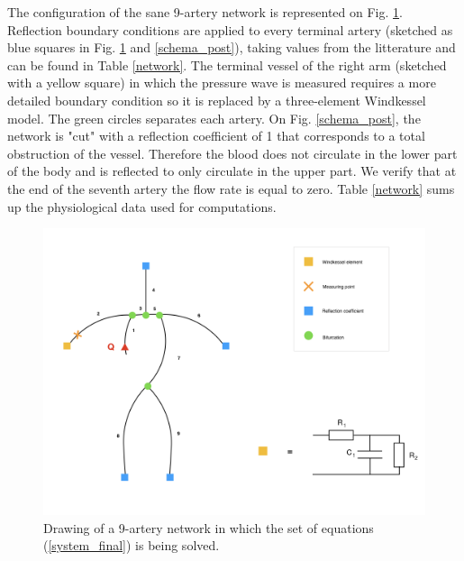 \documentclass{config}
\begin{document}
The configuration of the sane 9-artery network is represented on Fig. \ref{schema_pre}. Reflection boundary conditions are applied to every terminal artery (sketched as blue squares in Fig. \ref{schema_pre} and \ref{schema_post}), taking values from the litterature and can be found in Table \ref{network}. The terminal vessel of the right arm (sketched with a yellow square) in which the pressure wave is measured requires a more detailed boundary condition so it is replaced by a three-element Windkessel model. The green circles separates each artery.  On Fig. \ref{schema_post}, the network is "cut" with a reflection coefficient of 1 that corresponds to a total obstruction of the vessel. Therefore the blood does not circulate in the lower part of the body and is reflected to only circulate in the upper part. We verify that at the end of the seventh artery the flow rate is equal to zero.  Table \ref{network} sums up the physiological data used for computations. 

\begin{figure}[H]
\centering
\includegraphics[scale=0.35]{Figures/Schema_pre.png}
\caption{Drawing of a 9-artery network in which the set of equations (\ref{system_final}) is being solved.}
\label{schema_pre}
\end{figure}
\end{document}
